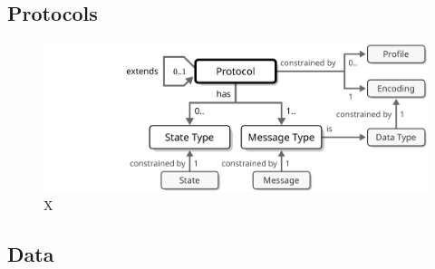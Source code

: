 \subsection{Protocols}

\begin{figure}[ht!]
  \centering
  \includegraphics{figures/protocol}
  \caption{
    X
  }
  \label{fig:protocol}
\end{figure}


\subsection{Data}
